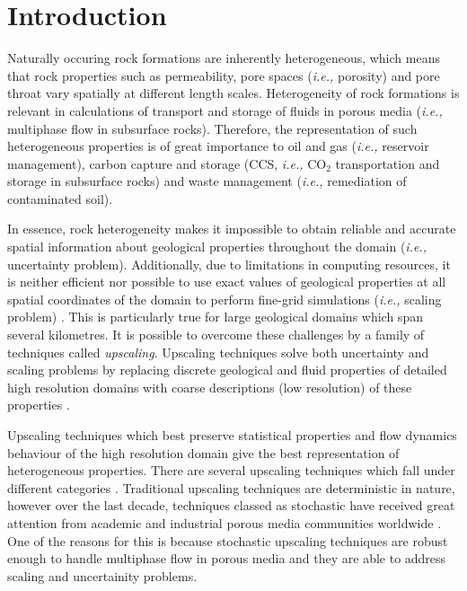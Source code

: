 \documentclass[preprint,12pt]{elsarticle}
\newcommand{\ie}{{\it i.e., }}
\begin{document}
\section{Introduction}\label{section:intro}
Naturally occuring rock formations are inherently heterogeneous, which means that rock properties such as permeability, pore spaces (\ie porosity) and pore throat vary spatially at different length scales. Heterogeneity of rock formations is relevant in calculations of transport and storage of fluids in porous media (\ie multiphase flow in subsurface rocks). Therefore, the representation of such heterogeneous properties is of great importance to oil and gas (\ie reservoir management), carbon capture and storage (CCS, \ie CO$_2$ transportation and storage in subsurface rocks) and waste management (\ie remediation of contaminated soil).

In essence, rock heterogeneity makes it impossible to obtain reliable and accurate spatial information about geological properties throughout the domain (\ie uncertainty problem). Additionally, due to limitations in computing resources, it is neither efficient nor possible to use exact values of geological properties at all spatial coordinates of the domain to perform fine-grid simulations (\ie scaling problem) \cite{chen_2006,miller_1998,Renard_1997}. This is particularly true for large geological domains which span several kilometres. It is possible to overcome these challenges by a family of techniques called {\it upscaling}. Upscaling techniques solve both uncertainty and scaling problems by replacing discrete geological and fluid properties of detailed high resolution domains with coarse descriptions (low resolution) of these properties \cite{Vereecken_2007}.

Upscaling techniques which best preserve statistical properties and flow dynamics behaviour of the high resolution domain give the best representation of heterogeneous properties. There are several upscaling techniques which fall under different categories \cite{Hasting_2001, Renard_1997, Szymkiewicz_2013}. Traditional upscaling techniques are deterministic in nature, however over the last decade, techniques classed as stochastic have received great attention from academic and industrial porous media communities worldwide \cite{Guilleminot_2012, Ravalec-Dupin_2010, Verwoerd_2009}. One of the reasons for this is because stochastic upscaling techniques are robust enough to handle multiphase flow in porous media and they are able to address scaling and uncertainity problems.
\end{document}
